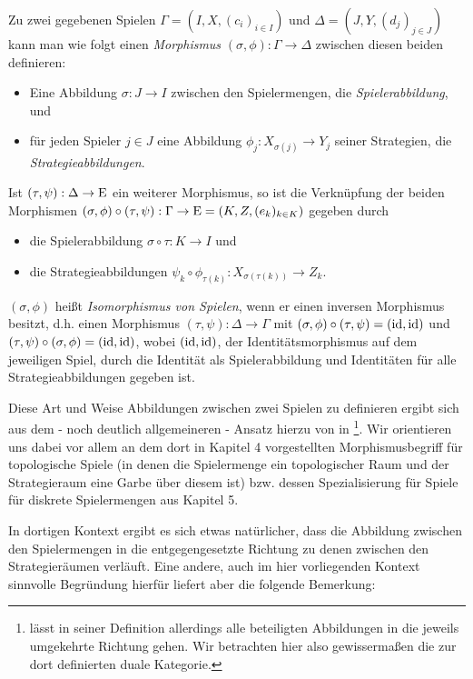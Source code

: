 \begin{defn}\label{defn:MorphismusVonSpielen}
	Zu zwei gegebenen Spielen $\Gamma = (I, X, (c_i)_{i\in I})$ und $\Delta = (J, Y, (d_j)_{j\in J})$ kann man wie folgt einen \emph{Morphismus} $(\sigma, \phi): \Gamma \to \Delta$ zwischen diesen beiden definieren:
	\begin{itemize}
		\item Eine Abbildung $\sigma: J \to I$ zwischen den Spielermengen, die \emph{Spielerabbildung}, und
		\item für jeden Spieler $j \in J$ eine Abbildung $\phi_j: X_{\sigma(j)} \to Y_j$ seiner Strategien, die \emph{Strategieabbildungen}.
	\end{itemize}
	Ist $(\tau, \psi): \Delta \to \mathrm{E}$ ein weiterer Morphismus, so ist die Verknüpfung der beiden Morphismen $(\sigma, \phi) \circ (\tau, \psi): \Gamma \to \mathrm{E} = (K, Z, (e_k)_{k \in K})$ gegeben durch
	\begin{itemize}
		\item die Spielerabbildung $\sigma\circ\tau: K \to I$ und
		\item die Strategieabbildungen $\psi_k \circ \phi_{\tau(k)}: X_{\sigma(\tau(k))} \to Z_k$.
	\end{itemize}
	$(\sigma, \phi)$ heißt \emph{Isomorphismus von Spielen}, wenn er einen inversen Morphismus besitzt, d.h. einen Morphismus $(\tau, \psi): \Delta \to \Gamma$ mit $(\sigma, \phi) \circ (\tau, \psi) = (\mathrm{id}, \mathrm{id})$ und $(\tau, \psi) \circ (\sigma, \phi) = (\mathrm{id}, \mathrm{id})$, wobei $(\mathrm{id}, \mathrm{id})$, der Identitätsmorphismus auf dem jeweiligen Spiel, durch die Identität als Spielerabbildung und Identitäten für alle Strategieabbildungen gegeben ist.
\end{defn}

Diese Art und Weise Abbildungen zwischen zwei Spielen zu definieren ergibt sich aus dem - noch deutlich allgemeineren - Ansatz hierzu von \citeauthor{LapGameCat} in \cite{LapGameCat}\footnote{\citeauthor{LapGameCat} lässt in seiner Definition allerdings alle beteiligten Abbildungen in die jeweils umgekehrte Richtung gehen. Wir betrachten hier also gewissermaßen die zur dort definierten duale Kategorie.}. Wir orientieren uns dabei vor allem an dem dort in Kapitel 4 vorgestellten Morphismusbegriff für topologische Spiele (in denen die Spielermenge ein topologischer Raum und der Strategieraum eine Garbe über diesem ist) bzw. dessen Spezialisierung für Spiele für diskrete Spielermengen aus Kapitel 5. 

In dortigen Kontext ergibt es sich etwas natürlicher, dass die Abbildung zwischen den Spielermengen in die entgegengesetzte Richtung zu denen zwischen den Strategieräumen verläuft. Eine andere, auch im hier vorliegenden Kontext sinnvolle Begründung hierfür liefert aber die folgende Bemerkung:

